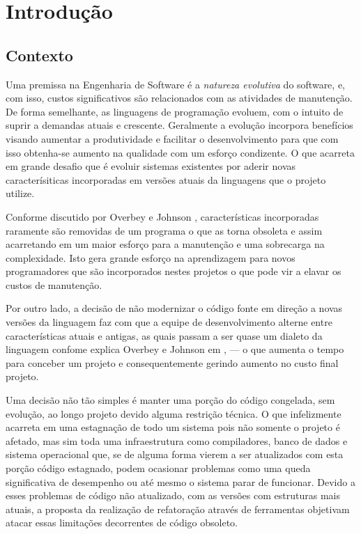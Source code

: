 \chapter{Introdução}



\section{Contexto}
Uma premissa na Engenharia de Software é a \emph{natureza evolutiva} do software, e, com isso, custos significativos são relacionados com as atividades de manutenção. De forma semelhante, as linguagens de programação evoluem, com o intuito de suprir a demandas atuais e crescente. Geralmente a evolução incorpora benefícios visando aumentar a produtividade e facilitar o desenvolvimento para que com isso obtenha-se aumento na qualidade com um esforço condizente. O que acarreta em grande desafio que é evoluir sistemas existentes por aderir novas caracterísiticas incorporadas em versões atuais da linguagens \cite{Dyer:2013} que o projeto utilize.

Conforme discutido por Overbey e Johnson \cite{Overbey:2009}, características incorporadas raramente são removidas de um programa o que as torna obsoleta e assim acarretando em um maior esforço para a manutenção e uma  sobrecarga na complexidade. Isto gera grande esforço na aprendizagem para novos programadores  que são incorporados nestes projetos o que pode vir a elavar os custos de manutenção. 

Por outro lado, a decisão de não modernizar o código fonte em direção a novas versões da linguagem faz com que a equipe de desenvolvimento alterne entre características atuais e antigas, as quais passam a ser quase um dialeto da linguagem confome explica Overbey e Johnson em \cite{Overbey:2009}, --- o que aumenta o tempo para conceber um projeto e consequentemente gerindo aumento no custo final projeto.

Uma decisão não tão simples é manter uma porção do código congelada, sem evolução, ao longo projeto devido alguma restrição técnica. O que infelizmente acarreta em uma estagnação de todo um sistema pois não somente o projeto é afetado, mas sim toda uma infraestrutura como compiladores, banco de dados e sistema operacional que, se de alguma forma vierem a ser atualizados com esta porção código estagnado, podem ocasionar problemas como uma queda significativa de desempenho ou até mesmo o sistema parar de funcionar. Devido a esses problemas de código não atualizado, com as versões com estruturas mais atuais, a proposta da realização de refatoração através de ferramentas objetivam atacar essas limitações decorrentes de código obsoleto.

